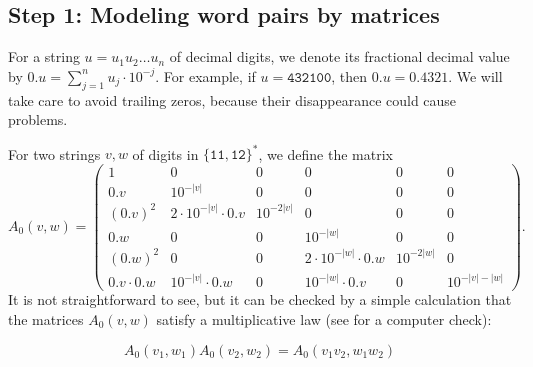 \documentclass[a4paper,cleveref, autoref, thm-restate]{lipics-v2021}
\begin{document}
\subsection{Step 1: Modeling word pairs by matrices}
\label{sec:step1}
For a string $u=u_1u_2\ldots u_n$ of decimal digits,
we denote its fractional 
 decimal value by
$0.u=
\sum_{j=1}^n u_j\cdot 10^{-j}$. For example, if $u=\mathtt{432100}$,
then
$0.u=0.4321$.
We will take care to avoid %
trailing zeros, because their disappearance could cause problems.


For two strings $v,w$ of digits in $\{\mathtt{11},\mathtt{12}\}^*$, we define the matrix
\begin{displaymath}
  A_0(v,w) =
\begin{pmatrix}
1 & 0 & 0 & 0 & 0 & 0 \\
0.v & 10^{-|v|} & 0 & 0 & 0 & 0 \\
(0.v)^2 & 2 \cdot 10^{-|v|}\cdot 0.v & 10^{-2|v|} & 0 & 0 & 0 \\
0.w & 0 & 0 & 10^{-|w|} & 0 & 0 \\
(0.w)^2 & 0 & 0 & 2 \cdot 10^{-|w|}\cdot 0.w & 10^{-2|w|} & 0 \\
0.v\cdot0.w & 10^{-|v|}\cdot 0.w & 0 & 10^{-|w|}\cdot 0.v & 0 & 10^{-|v|-|w|}
\end{pmatrix}.
\end{displaymath}
It is not straightforward to see, but it can be checked by a
simple %
calculation %
that the matrices $A_0(v,w)$ satisfy a
multiplicative law
(see  for a computer check):


\begin{lemma}
  \label{lem:multi}
\begin{equation}
  \label{eq:multi_0}
 A_0 (v_1,w_1)
 A_0 (v_2,w_2) =
 A_0 (v_1v_2,w_1w_2)
\end{equation}
\end{lemma}
\end{document}
